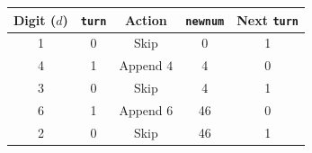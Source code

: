 \begin{tabular}{|c|c|c|c|c|}
\hline
Digit ($d$) & \texttt{turn} & Action & \texttt{newnum} & Next \texttt{turn} \\ \hline
1 & 0 & Skip & 0 & 1 \\
4 & 1 & Append $4$ & 4 & 0 \\
3 & 0 & Skip & 4 & 1 \\
6 & 1 & Append $6$ & 46 & 0 \\
2 & 0 & Skip & 46 & 1 \\ \hline
\end{tabular}
